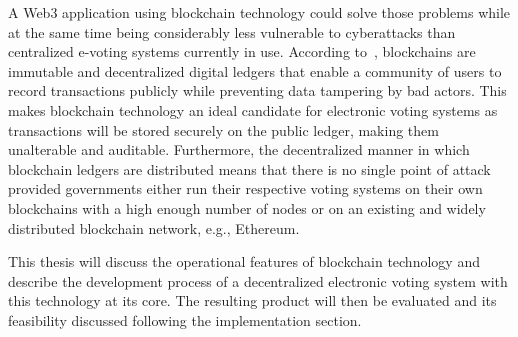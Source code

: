 A \Gls{Web3} application using blockchain technology could solve those problems while at the same time being considerably less vulnerable to cyberattacks than centralized e-voting systems currently in use.
According to~\textcite{yaga_blockchain_2018}, blockchains are immutable and decentralized digital ledgers that enable a community of users to record transactions publicly while preventing data tampering by bad actors.
This makes blockchain technology an ideal candidate for electronic voting systems as transactions will be stored securely on the public ledger, making them unalterable and auditable.
Furthermore, the decentralized manner in which blockchain ledgers are distributed means that there is no single point of attack provided governments either run their respective voting systems on their own blockchains
with a high enough number of nodes or on an existing and widely distributed blockchain network, e.g., Ethereum.

This thesis will discuss the operational features of blockchain technology and describe the development process of a decentralized electronic voting system with this technology at its core.
The resulting product will then be evaluated and its feasibility discussed following the implementation section.



